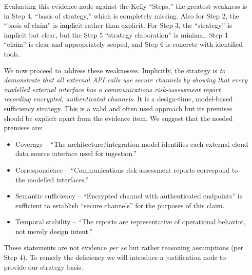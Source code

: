 \documentclass{article}
\begin{document}
Evaluating this evidence node against the Kelly ``Steps,'' the greatest weakness is in Step 4, ``basis of strategy,'' which is completely missing. Also for Step 2, the ``basis of claim'' is implicit rather than explicit. For Step 3, the ``strategy'' is implicit but clear, but the Step 5 ``strategy elaboration'' is minimal.
Step 1 ``claim'' is clear and appropriately scoped, and Step 6 is concrete with identified tools.

We now proceed to address these weaknesses.
Implicitly, the strategy is \emph{to demonstrate that all external API calls use secure channels by showing that every modelled external interface has a communications risk-assessment report recording encrypted, authenticated channels.} It is a design-time, model-based sufficiency strategy. This is a valid and often used approach but its premises should be explicit apart from the evidence item. We suggest that the needed premises are:
\begin{itemize}
    \item Coverage -- ``The architecture/integration model identifies each external cloud data source interface used for ingestion.''
    \item Correspondence -- ``Communications risk-assessment reports correspond to the modelled interfaces.''
    \item Semantic sufficiency -- ``Encrypted channel with authenticated endpoints'' is sufficient to establish ``secure channels'' for the purposes of this claim.
    \item Temporal stability -- ``The reports are representative of operational behavior, not merely design intent.''
\end{itemize}
These statements are not evidence \emph{per se} but rather reasoning assumptions (per Step 4).
To remedy the deficiency we will introduce a justification node to provide our strategy basis.
\end{document}
